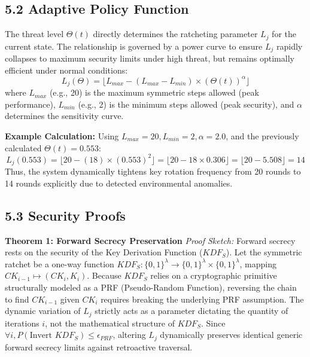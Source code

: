 \documentclass[12pt]{article}
\begin{document}
\subsection*{5.2 Adaptive Policy Function}

The threat level $\Theta(t)$ directly determines the ratcheting parameter $L_j$ for the current state. The relationship is governed by a power curve to ensure $L_j$ rapidly collapses to maximum security limits under high threat, but remains optimally efficient under normal conditions:
\[
L_j(\Theta) = \lfloor L_{max} - (L_{max} - L_{min}) \times (\Theta(t))^{\alpha} \rfloor
\]
where $L_{max}$ (e.g., 20) is the maximum symmetric steps allowed (peak performance), $L_{min}$ (e.g., 2) is the minimum steps allowed (peak security), and $\alpha$ determines the sensitivity curve.

\textbf{Example Calculation:} 
Using $L_{max} = 20, L_{min} = 2, \alpha = 2.0$, and the previously calculated $\Theta(t) = 0.553$:
\[
L_j(0.553) = \lfloor 20 - (18) \times (0.553)^2 \rfloor = \lfloor 20 - 18 \times 0.306 \rfloor = \lfloor 20 - 5.508 \rfloor = 14
\]
Thus, the system dynamically tightens key rotation frequency from 20 rounds to 14 rounds explicitly due to detected environmental anomalies.

\subsection*{5.3 Security Proofs}

\textbf{Theorem 1: Forward Secrecy Preservation}
\textit{Proof Sketch:} Forward secrecy rests on the security of the Key Derivation Function ($KDF_S$). Let the symmetric ratchet be a one-way function $KDF_S: \{0,1\}^\lambda \to \{0,1\}^{\lambda} \times \{0,1\}^\lambda$, mapping $CK_{i-1} \mapsto (CK_i, K_i)$. Because $KDF_S$ relies on a cryptographic primitive structurally modeled as a PRF (Pseudo-Random Function), reversing the chain to find $CK_{i-1}$ given $CK_i$ requires breaking the underlying PRF assumption. The dynamic variation of $L_j$ strictly acts as a parameter dictating the quantity of iterations $i$, not the mathematical structure of $KDF_S$. Since $\forall i, P(\text{Invert } KDF_S) \le \epsilon_{PRF}$, altering $L_j$ dynamically preserves identical generic forward secrecy limits against retroactive traversal.
\end{document}
